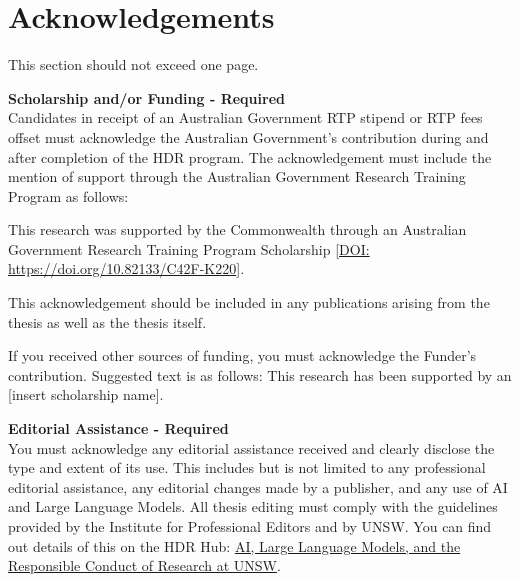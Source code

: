 \documentclass[hdr, \ifDraft draft\else final\fi, \Spacing]{unswthesis}
\begin{document}
\newcommand{\lstnumberautorefname}{Line}
\renewcommand{\chapterautorefname}{Chapter}
\renewcommand{\sectionautorefname}{Section}
\renewcommand{\subsectionautorefname}{Section}
\renewcommand{\subsubsectionautorefname}{Section}
\renewcommand{\appendixautorefname}{Appendix}
\renewcommand{\Hfootnoteautorefname}{Footnote}
\newcommand{\Htextbf}[1]{\textbf{\hyperpage{#1}}}



\frontmatter
\maketitle


\chapter{Acknowledgements}

This section should not exceed one page.

\textbf{Scholarship and/or Funding - Required}\\
Candidates in receipt of an Australian Government RTP stipend or RTP fees offset must acknowledge the Australian Government's contribution during and after completion of the HDR program. The acknowledgement must include the mention of support through the Australian Government Research
Training Program as follows:

This research was supported by the Commonwealth through an Australian Government Research
Training Program Scholarship [\href{https://doi.org/10.82133/C42F-K220}{DOI: https://doi.org/10.82133/C42F-K220}].

This acknowledgement should be included in any publications arising from the thesis as well as the thesis itself.

If you received other sources of funding, you must acknowledge the Funder's contribution. Suggested
text is as follows:
This research has been supported by an [insert scholarship name].

\textbf{Editorial Assistance - Required}\\
You must acknowledge any editorial assistance received and clearly disclose the type and extent of its
use. This includes but is not limited to any professional editorial assistance, any editorial changes
made by a publisher, and any use of AI and Large Language Models. All thesis editing must comply
with the guidelines provided by the Institute for Professional Editors and by UNSW. You can find out
details of this on the HDR Hub: \href{https://unsw.sharepoint.com/sites/unswhdr/SitePages/AI-LLMs-and-Responsible-Conduct-of-Research.aspx}{AI, Large Language Models, and the Responsible Conduct of Research
at UNSW}.
\end{document}
